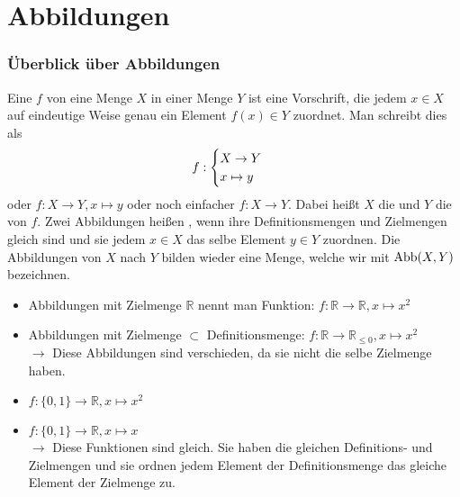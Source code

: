 \section{Abbildungen}

\subsubsection{Überblick über Abbildungen}
Eine  $f$ von eine Menge $X$ in einer Menge $Y$ ist eine Vorschrift, die jedem $x \in X$
auf eindeutige Weise genau ein Element $f(x) \in Y$ zuordnet. Man schreibt dies als 
\begin{align}
f:
\begin{cases}
X \to Y \\ x \mapsto y
\end{cases}\notag
\end{align}
oder $f: X \to Y, x \mapsto y$ oder noch einfacher $f: X \to Y$. Dabei heißt $X$ die
 und $Y$ die  von $f$. Zwei Abbildungen heißen , wenn ihre
Definitionsmengen und Zielmengen gleich sind und sie jedem $x \in X$ das selbe Element
$y \in Y$ zuordnen. Die Abbildungen von $X$ nach $Y$ bilden wieder eine Menge, welche wir 
mit $\operatorname{Abb}(X,Y)$ bezeichnen. \\

\begin{example}
	\begin{itemize}
		\item Abbildungen mit Zielmenge $\mathbb R$ nennt man Funktion: $f: \mathbb R \to \mathbb
		R, x \mapsto x^2$
		\item Abbildungen mit Zielmenge $\subset$ Definitionsmenge: $f: \mathbb R \to \mathbb
		R_{\le 0}, x \mapsto x^2$ \\
		$\to$ Diese Abbildungen sind verschieden, da sie nicht die selbe Zielmenge haben.
		\item $f: \{0,1\} \to \mathbb R, x \mapsto x^2$
		\item $f: \{0,1\} \to \mathbb R, x \mapsto x$ \\
		$\to$ Diese Funktionen sind gleich. Sie haben die gleichen Definitions- und Zielmengen 
		und sie ordnen jedem Element der Definitionsmenge das gleiche Element der Zielmenge zu.
	\end{itemize}
\end{example}

